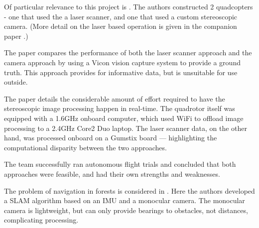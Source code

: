 \documentclass[12pt,oneside,a4paper,draft]{book}
\begin{document}
Of particular relevance to this project is \cite{achtelik2009stereo}. The authors
constructed 2 quadcopters - one that used the a laser scanner, and one
that used a custom stereoscopic camera. (More detail on the laser
based operation is given in the companion paper
\cite{Bachrach09autonomousflight}.) 

The paper compares the performance of both the laser scanner approach
and the camera approach by using a Vicon vision capture system to
provide a ground truth. This approach provides for informative data,
but is unsuitable for use outside.

The paper details the considerable amount of effort required to have
the stereoscopic image processing happen in real-time. The quadrotor
itself was equipped with a 1.6GHz onboard computer, which used WiFi to
offload image processing to a 2.4GHz Core2 Duo laptop. The laser
scanner data, on the other hand, was processed onboard on a Gumstix
board --- highlighting the computational disparity between the two
approaches.


The team successfully ran autonomous flight trials and concluded that
both approaches were feasible, and had their own strengths and
weaknesses.




The problem of navigation in forests is considered in
\cite{langelaan2005towards}. Here the authors developed a SLAM
algorithm based on an \gls{IMU} and a monocular camera. The monocular
camera is lightweight, but can only provide bearings to obstacles, not
distances, complicating processing.
\end{document}
